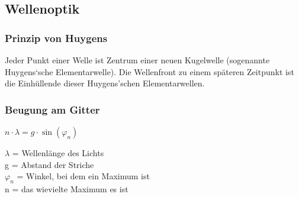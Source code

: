 \subsection{Wellenoptik}

\subsubsection{Prinzip von Huygens }
Jeder Punkt einer Welle ist Zentrum einer neuen Kugelwelle  
(sogenannte Huygens‘sche Elementarwelle). 
Die Wellenfront zu einem späteren Zeitpunkt ist die Einhüllende dieser Huygens'schen Elementarwellen.

\subsubsection{Beugung am Gitter}
\begin{minipage}{3cm}
	$n \cdot \lambda = g \cdot \sin(\varphi_n)$
\end{minipage}
\begin{minipage}{5cm}
	$\lambda$ = Wellenlänge des Lichts\\
	g = Abstand der Striche\\
	$\varphi_n$ = Winkel, bei dem ein Maximum ist\\
	n = das wievielte Maximum es ist
\end{minipage}

\newpage
